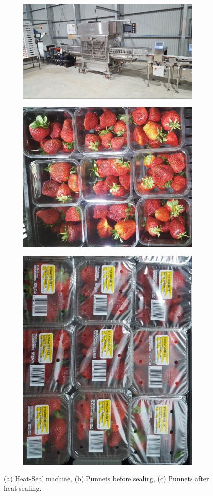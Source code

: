 \documentclass[fleqn,twoside,12pt]{report}
\begin{document}
\begin{figure}[ht!]
	\centering
	\begin{subfigure}{\textwidth}
		\centering
		\includegraphics[width=.8\linewidth]{heat_seal.jpg}
		\caption{}
		\label{fig:heat_seal}
	\end{subfigure}%
	
	\begin{subfigure}{.5\textwidth}
		\centering
		\includegraphics[width=.6\linewidth]{unsealed_punnets.jpg}
		\caption{}
		\label{fig:unsealed_punnets}
	\end{subfigure}%
	\begin{subfigure}{.5\textwidth}
		\centering
		\includegraphics[width=.5\linewidth, angle=90]{sealed_punnets.jpg}
		\caption{}
		\label{fig:sealed_punnets}
	\end{subfigure}%
	\caption{(a) Heat-Seal machine, (b) Punnets before sealing, (c) Punnets after heat-sealing.}
	\label{fig:HS}
\end{figure}
\end{document}
